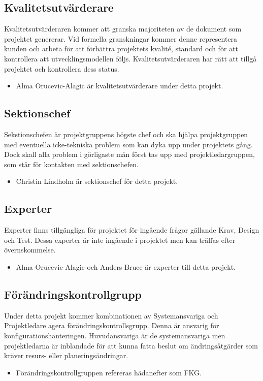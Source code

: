 \documentclass[paper=a4, fontsize=11pt,twoside]{article}
\begin{document}
\subsection*{Kvalitetsutvärderare}
Kvalitetsutvärderaren kommer att granska majoriteten av de dokument som projektet genererar. Vid formella granskningar kommer denne representera kunden och arbeta för att förbättra projektets kvalité, standard och för att kontrollera att utvecklingsmodellen följs. Kvalitetsutvärderaren har rätt att tillgå projektet och kontrollera dess status.
\begin{itemize}
\item Alma Orucevic-Alagic är kvalitetsutvärderare under detta projekt.
\end{itemize}

\subsection*{Sektionschef}
Sekstionschefen är projektgruppens högste chef och ska hjälpa projektgruppen med eventuella icke-tekniska problem som kan dyka upp under projektets gång. Dock skall alla problem i görligaste mån först tas upp med projektledargruppen, som står för kontakten med sektionschefen.
\begin{itemize}
\item Christin Lindholm är sektionschef för detta projekt.
\end{itemize}
		
	 
\subsection*{Experter}
Experter finns tillgängliga för projektet för ingående frågor gällande Krav, Design och Test. Dessa experter är inte ingående i projektet men kan träffas efter övernskommelse.
\begin{itemize}
\item Alma Orucevic-Alagic och Anders Bruce är experter till detta projekt. %
\end{itemize}
	

\subsection*{Förändringskontrollgrupp}
Under detta projekt kommer kombinationen av Systemansvariga och Projektledare agera förändringskontrollsgrupp. Denna är ansvarig för konfigurationshanteringen. Huvudansvariga är de systemansvariga men projektledarna är inblandade för att kunna fatta beslut om ändringsåtgärder som kräver resurs- eller planeringsändringar.
\begin{itemize}
\item Förändringskontrollgruppen refereras hädanefter som FKG. 
\end{itemize}
		
\end{document}
